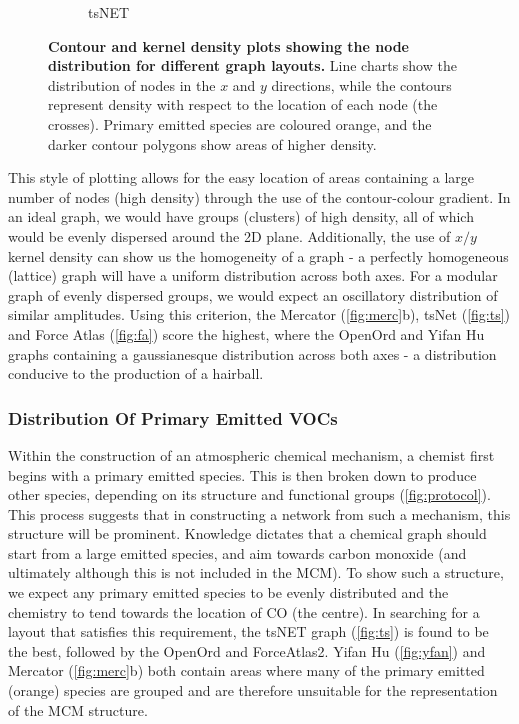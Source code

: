 \begin{figure}[H]
\begin{subfigure}[b]{.49\textwidth}
         \caption{tsNET}
         \label{fig:ts}
     \end{subfigure}
      \hfill
        \caption{ \textbf{Contour and kernel density plots showing the node distribution for different graph layouts.} Line charts show the distribution of nodes in the $x$ and $y$ directions, while the contours represent density with respect to the location of each node (the crosses). Primary emitted species are coloured orange, and the darker contour polygons show areas of higher density.}
        \label{fig:densitycompare}
\end{figure}

This style of plotting allows for the easy location of areas containing a large number of nodes (high density) through the use of the contour-colour gradient. In an ideal graph, we would have groups (clusters) of high density, all of which would be evenly dispersed around the 2D plane.
Additionally, the use of $x/y$ kernel density can show us the homogeneity of a graph - a perfectly homogeneous (lattice) graph will have a uniform distribution across both axes. For a modular graph of evenly dispersed groups, we would expect an oscillatory distribution of similar amplitudes. Using this criterion, the Mercator (\autoref{fig:merc}b), tsNet (\autoref{fig:ts}) and Force Atlas (\autoref{fig:fa}) score the highest, where the OpenOrd and Yifan Hu graphs containing a gaussianesque distribution across both axes - a distribution conducive to the production of a hairball.

\subsubsection{Distribution Of Primary Emitted VOCs}

Within the construction of an atmospheric chemical mechanism, a chemist first begins with a primary emitted species. This is then broken down to produce other species, depending on its structure and functional groups (\autoref{fig:protocol}). This process suggests that in constructing a network from such a mechanism, this structure will be prominent. Knowledge dictates that a chemical graph should start from a large emitted species, and aim towards carbon monoxide (and ultimately  although this is not included in the MCM). To show such a structure, we expect any primary emitted species to be evenly distributed and the chemistry to tend towards the location of CO (the centre). In searching for a layout that satisfies this requirement, the tsNET graph (\autoref{fig:ts}) is found to be the best, followed by the OpenOrd and ForceAtlas2. Yifan Hu (\autoref{fig:yfan}) and Mercator (\autoref{fig:merc}b) both contain areas where many of the primary emitted (orange) species are grouped and are therefore unsuitable for the representation of the MCM structure.


